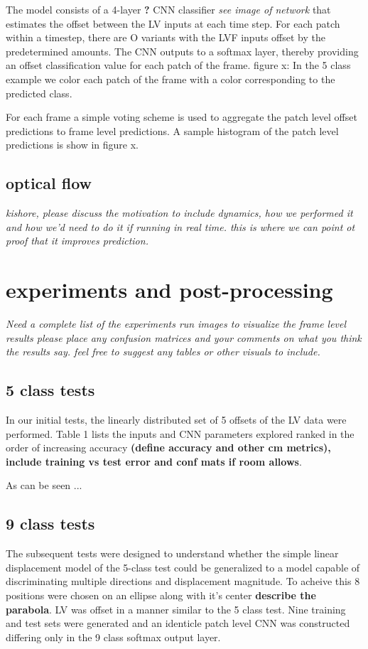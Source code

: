 \documentclass{article}
\begin{document}
The model consists of a 4-layer \textbf{?} CNN classifier \textit{see image of network} that estimates the offset between the LV inputs at each time step. For each patch within a timestep, there are O variants with the LVF inputs offset by the predetermined amounts. The CNN outputs to a softmax layer, thereby providing an offset classification value for each patch of the frame. 
figure x: In the 5 class example we color each patch of the frame with a color corresponding to the predicted class. 

For each frame a simple voting scheme is used to aggregate the patch level offset predictions to frame level predictions. A sample histogram of the patch level predictions is show in figure x.

\subsection{optical flow} \textit{kishore, please discuss the motivation to include dynamics, how we performed it and how we'd need to do it if running in real time. this is where we can point ot proof that it improves prediction.}

\section{experiments and post-processing}
\textit{Need a complete list of the experiments run
images to visualize the frame level results
please place any confusion matrices and your comments on what you think the results say.
feel free to suggest any tables or other visuals to include.}

\subsection{5 class tests}
In our initial tests, the linearly distributed set of 5 offsets of the LV data were performed. Table 1 lists the inputs and CNN parameters explored ranked in the order of increasing accuracy \textbf{(define accuracy and other cm metrics), include training vs test error and conf mats if room allows}.  

As can be seen ... 

\subsection{9 class tests}
The subsequent tests were designed to understand whether the simple linear displacement model of the 5-class test could be generalized to a model capable of discriminating multiple directions and displacement magnitude. To acheive this 8 positions were chosen on an ellipse along with it's center \textbf{describe the parabola}. LV was offset in a manner similar to the 5 class test. Nine training and test sets were generated and an identicle patch level CNN was constructed differing only in the 9 class softmax output layer. 
\end{document}
